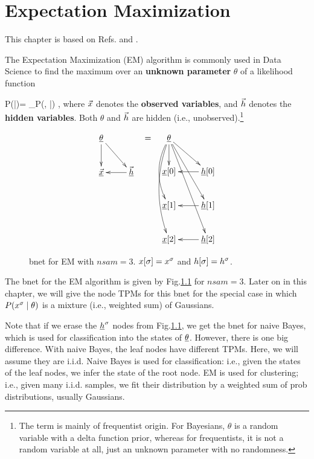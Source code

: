 \chapter{Expectation Maximization}
\label{ch-emax}

This chapter is based on
Refs.\cite{wiki-em}
and \cite{emory-biostat}.

The Expectation Maximization (EM)
algorithm
is commonly used in Data Science
to find the maximum
over an {\bf unknown parameter} $\theta$ of a
 likelihood function

\beq
P(\vecx|\theta)=
\sum_\vech P(\vecx, \vech|\theta)
\;,
\eeq
where ${\vec{x}}$
denotes the {\bf observed variables},
and ${\vec{h}}$ denotes the
{\bf hidden variables}.
Both $\theta$
and ${\vec{h}}$
are hidden (i.e.,
unobserved).\footnote{
The term
is mainly of frequentist origin.
For Bayesians, $\theta$
is a random variable with
a delta function prior,
whereas for frequentists,
it is not
a random variable at all,
just an unknown parameter
with no randomness.}



\begin{figure}[h!]
\centering
$$\begin{array}{ccc}
\xymatrix{
\ul{\theta}\ar[d]\ar[dr]
\\
\ul{\vecx}&\ul{\vech}\ar[l]
}
&=&
\xymatrix{
\ul{\theta}
\ar[d]
\ar@/_1pc/[dd]
\ar@/_1pc/[ddd]
\ar[rd]\ar[rdd]\ar[rddd]
\\
\rvx[0]
&\rvh[0]\ar[l]
\\
\rvx[1]
&\rvh[1]\ar[l]
\\
\rvx[2]
&\rvh[2]\ar[l]
}
\end{array}
$$
\caption{bnet for EM with $nsam=3$.
$x[\sigma]=x^\sigma$ and $h[\sigma]=h^\sigma$.}
\label{fig-em-bnet}
\end{figure}


The bnet for the EM algorithm
is given by Fig.\ref{fig-em-bnet}
for $nsam=3$.
Later on in this chapter,
we will give the node TPMs
for this bnet for
the special
case in which $P(x^\sigma\mid \theta)$
is a mixture (i.e., weighted sum)
of Gaussians.

Note that if we
erase the $\rvh^\s$ nodes
from Fig.\ref{fig-em-bnet},
we get the bnet for naive Bayes,
which is used for classification
into the states of $\ul{\theta}$.
However, there is one big
difference.
With naive Bayes,
the leaf nodes have
different TPMs.
Here, we will assume they are i.i.d.
Naive Bayes is used for classification: i.e.,
given the states
of the leaf nodes,
we infer the state of the root node.
EM is used for clustering; i.e.,
given many i.i.d. samples,
we fit their distribution by a weighted sum
of prob distributions,
usually Gaussians.

